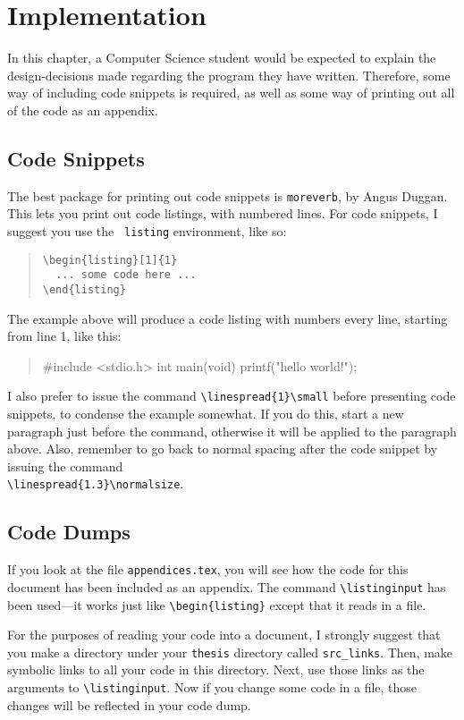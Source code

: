 \chapter{Implementation}
\label{chap:code}

In this chapter, a Computer Science student would be expected to
explain the design-decisions made regarding the program they have
written.  Therefore, some way of including code snippets is required,
as well as some way of printing out all of the code as an appendix.

\section{Code Snippets}
The best package for printing out code snippets is {\tt moreverb}, by
Angus Duggan.  This lets you print out code listings, with
numbered lines.  For code snippets, I suggest you use the {\tt
listing} environment, like so:

\linespread{1} \small
\begin{quote}
\begin{verbatim}
\begin{listing}[1]{1}
  ... some code here ...
\end{listing}
\end{verbatim}
\end{quote}

\linespread{1.3} \normalsize
The example above will produce a code listing with numbers every line,
starting from line 1, like this: 

\linespread{1} \small
\begin{quote}
\begin{listing}[1]{1}
#include <stdio.h>
int main(void) {
  printf("hello world!\n");
}
\end{listing}
\end{quote} 
\linespread{1.3} \normalsize

I also prefer to issue the command \verb|\linespread{1}\small| before
presenting code snippets, to condense the example somewhat.  If you do
this, start a new paragraph just before the command, otherwise it
will be applied to the paragraph above.  Also, remember to go back to
normal spacing after the code snippet by issuing the command\\
\verb|\linespread{1.3}\normalsize|.

\section{Code Dumps}
If you look at the file {\tt appendices.tex}, you will see how the
code for this document has been included as an appendix.  The
command \verb|\listinginput| has been used---it works just like
\verb|\begin{listing}| except that it reads in a file.

For the purposes of reading your code into a document, I strongly
suggest that you make a directory under your {\tt thesis} directory
called {\tt src\_links}.  Then, make symbolic links to all your code
in this directory.  Next, use those links as the arguments to
\verb|\listinginput|. Now if you change some code in a file, those
changes will be reflected in your code dump.
